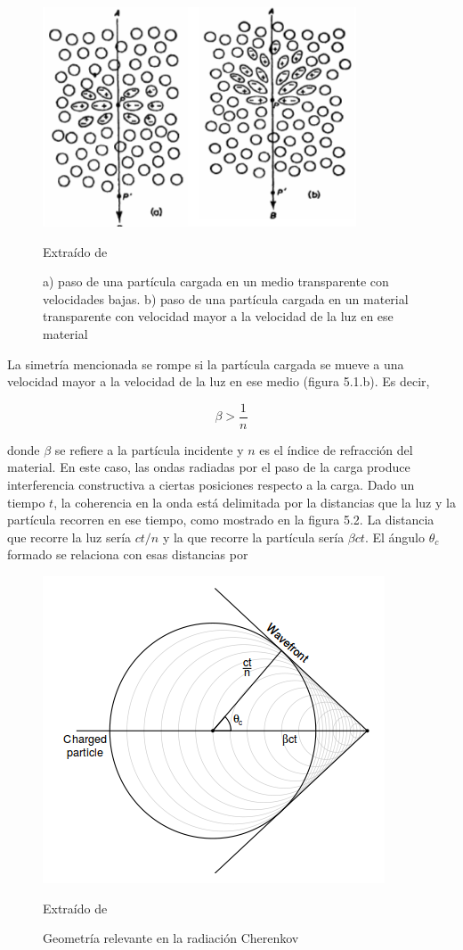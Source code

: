 \documentclass{book}
\begin{document}
\begin{figure}[ht] %
\begin{center}
 \includegraphics[width = 0.5\linewidth]{Pol1.png}
 
 Extra\'ido de \citep{GROUPENS}
\caption{a) paso de una part\'icula cargada en un medio transparente con velocidades bajas. b) paso de una part\'icula cargada en un material transparente con velocidad mayor a la velocidad de la luz en ese material}
\end{center}
\end{figure}

La simetr\'ia mencionada se rompe si la part\'icula cargada se mueve a una velocidad mayor a la velocidad de la luz en ese medio (figura 5.1.b). Es decir,

\begin{equation}
\beta > \frac{1}{n}
\end{equation}

donde $\beta$ se refiere a la part\'icula incidente y $n$ es el \'indice de refracci\'on del material. En este caso, las ondas radiadas por el paso de la carga produce interferencia constructiva a ciertas posiciones respecto a la carga. Dado un tiempo $t$, la coherencia en la onda est\'a delimitada por la distancias que la luz y la part\'icula recorren en ese tiempo, como mostrado en la figura 5.2. La distancia que recorre la luz ser\'ia $ct/n$ y la que recorre la part\'icula ser\'ia $\beta ct$. El \'angulo $\theta_c$ formado se relaciona con esas distancias por

\begin{figure}[ht] %
\begin{center}
 \includegraphics[width = 0.4\linewidth]{GeometriaCherenkov.png}
 
 Extra\'ido de \citep{BALDINI}
\caption{Geometr\'ia relevante en la radiaci\'on Cherenkov}
\end{center}
\end{figure}
\end{document}
